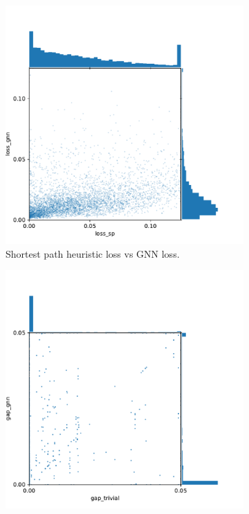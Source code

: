 \documentclass[english, 12pt, a4paper, sci, utf8, a-2b, online]{aaltothesis}
\begin{document}
\begin{figure} 
    \begin{subfigure}{0.5\textwidth}
        \centering
        \includegraphics[width=\linewidth]{figures/loss-loss.pdf}
        \caption{Shortest path heuristic loss vs GNN loss.}
        \label{fig:results-ll}
    \end{subfigure}
    \begin{subfigure}{0.5\textwidth}
        \centering
        \includegraphics[width=\linewidth]{figures/gap-gap.pdf}

\end{subfigure}
\end{figure}
\end{document}
